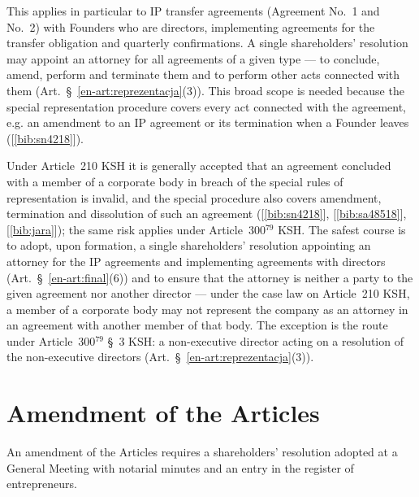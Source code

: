 \documentclass[11pt,a4paper]{report}
\newcommand{\Zr}[1]{[\ref{bib:#1}]}
\begin{document}
This applies in particular to IP transfer agreements (Agreement No.~1 and No.~2) with Founders who are directors, implementing agreements for the transfer obligation and quarterly confirmations. A single shareholders' resolution may appoint an attorney for all agreements of a given type --- to conclude, amend, perform and terminate them and to perform other acts connected with them (Art.~\S~\ref{en-art:reprezentacja}(3)). This broad scope is needed because the special representation procedure covers every act connected with the agreement, e.g. an amendment to an IP agreement or its termination when a Founder leaves (\Zr{sn4218}).

\begin{Komentarz}
Under Article~210 KSH it is generally accepted that an agreement concluded with a member of a corporate body in breach of the special rules of representation is invalid, and the special procedure also covers amendment, termination and dissolution of such an agreement (\Zr{sn4218}, \Zr{sa48518}, \Zr{jara}); the same risk applies under Article~300$^{79}$ KSH. The safest course is to adopt, upon formation, a single shareholders' resolution appointing an attorney for the IP agreements and implementing agreements with directors (Art.~\S~\ref{en-art:final}(6)) and to ensure that the attorney is neither a party to the given agreement nor another director --- under the case law on Article~210 KSH, a member of a corporate body may not represent the company as an attorney in an agreement with another member of that body. The exception is the route under Article~300$^{79}$ \S~3 KSH: a non-executive director acting on a resolution of the non-executive directors (Art.~\S~\ref{en-art:reprezentacja}(3)).
\end{Komentarz}

\section{Amendment of the Articles}

An amendment of the Articles requires a shareholders' resolution adopted at a General Meeting with notarial minutes and an entry in the register of entrepreneurs.
\end{document}
